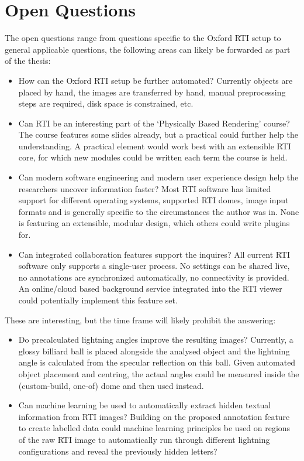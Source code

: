 \documentclass{article}
\begin{document}
\section{Open Questions}
The open questions range from questions specific to the Oxford RTI setup to
general applicable questions, the following areas can likely be forwarded as
part of the thesis:
\begin{itemize}
\item  How can the Oxford RTI setup be further automated? Currently objects are
  placed by hand, the images are transferred by hand, manual preprocessing steps
  are required, disk space is constrained, etc.
\item Can RTI be an interesting part of the `Physically Based Rendering' course?
  The course features some slides already, but a practical could further help
  the understanding. A practical element would work best with an extensible RTI
  core, for which new modules could be written each term the course is held.
\item Can modern software engineering and modern user experience design help the
  researchers uncover information faster? Most RTI software has limited support
  for different operating systems, supported RTI domes, image input formats and
  is generally specific to the circumstances the author was in. None is
  featuring an extensible, modular design, which others could write plugins for.
\item Can integrated collaboration features support the inquires? All current
  RTI software only supports a single-user process. No settings can be shared
  live, no annotations are synchronized automatically, no connectivity is
  provided. An online/cloud based background service integrated into the RTI
  viewer could potentially implement this feature set.
\end{itemize}

These are interesting, but the time frame will likely prohibit the answering:
\begin{itemize}
\item Do precalculated lightning angles improve the resulting images? Currently,
  a glossy billiard ball is placed alongside the analysed object and the
  lightning angle is calculated from the specular reflection on this ball. Given
  automated object placement and centring, the actual angles could be measured
  inside the (custom-build, one-of) dome and then used instead.
\item Can machine learning be used to automatically extract hidden textual
  information from RTI images? Building on the proposed annotation feature to
  create labelled data could machine learning principles be used on regions of
  the raw RTI image to automatically run through different lightning
  configurations and reveal the previously hidden letters?
\end{itemize}
\end{document}
